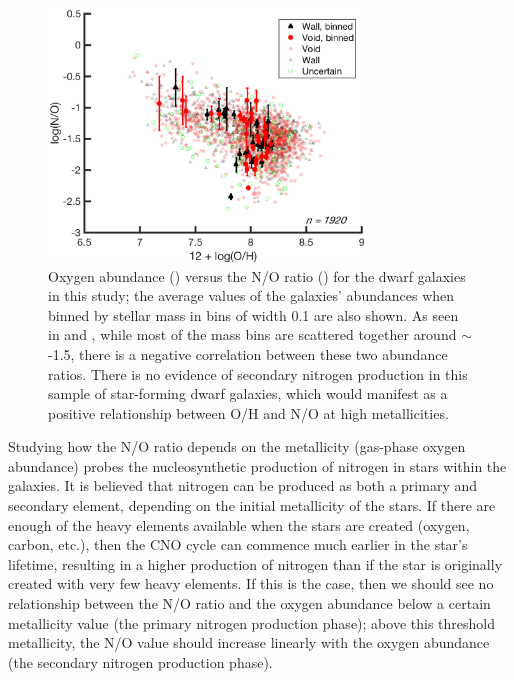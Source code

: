 \begin{figure}
    \centering
    \includegraphics[width=0.75\textwidth]{Images/Paper3/1sig_I06relations_dwarf_SF_t3_dust_NSA_Z12logOH_logNO_scatterMbin}
    \caption[O/H versus N/O for star-forming dwarf galaxies]{Oxygen abundance 
    (\OH) versus the N/O ratio (\NO) for the dwarf galaxies in this study; the 
    average values of the galaxies' abundances when binned by stellar mass in 
    bins of width 0.1 are also shown.  As seen in \cite{Andrews13} and 
    \cite{Douglass17b}, while most of the mass bins are scattered together 
    around \NO $\sim$-1.5, there is a negative correlation between these two 
    abundance ratios.  There is no evidence of secondary nitrogen production in 
    this sample of star-forming dwarf galaxies, which would manifest as a 
    positive relationship between O/H and N/O at high metallicities.}
    \label{fig:NOvOH}
\end{figure}

Studying how the N/O ratio depends on the metallicity (gas-phase oxygen 
abundance) probes the nucleosynthetic production of nitrogen in stars within the 
galaxies.  It is believed that nitrogen can be produced as both a primary and 
secondary element, depending on the initial metallicity of the stars.  If there 
are enough of the heavy elements available when the stars are created (oxygen, 
carbon, etc.), then the CNO cycle can commence much earlier in the star's 
lifetime, resulting in a higher production of nitrogen than if the star is 
originally created with very few heavy elements.  If this is the case, then we 
should see no relationship between the N/O ratio and the oxygen abundance below 
a certain metallicity value (the primary nitrogen production phase); above this 
threshold metallicity, the N/O value should increase linearly with the oxygen 
abundance (the secondary nitrogen production phase).

